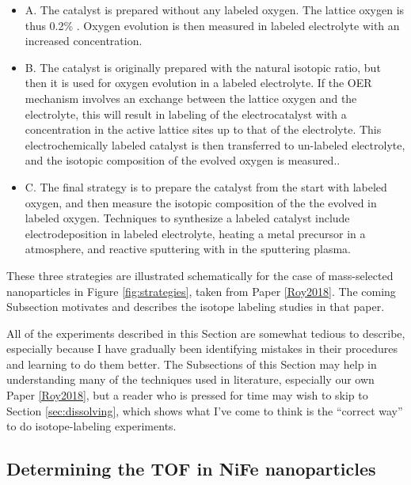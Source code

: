\begin{itemize}
	\item A. The catalyst is prepared without any labeled oxygen. The lattice oxygen is thus 0.2\% . Oxygen evolution is then measured in labeled electrolyte with an increased  concentration\cite{Wohlfahrt-Mehrens1987, Fierro2007, Macounova2009, Amin2017, Roy2018a}.
	
	\item B. The catalyst is originally prepared with the natural isotopic ratio, but then it is used for oxygen evolution in a labeled electrolyte. If the OER mechanism involves an exchange between the lattice oxygen and the electrolyte, this will result in labeling of the electrocatalyst with a  concentration in the active lattice sites up to that of the electrolyte. This electrochemically labeled catalyst is then transferred to un-labeled electrolyte, and the isotopic composition of the evolved oxygen is measured.\cite{Willsau1985, Diaz-Morales2013, Stoerzinger2017a, Amin2017, Grimaud2017, Roy2018a}.
	
	\item C. The final strategy is to prepare the catalyst from the start with labeled oxygen, and then measure the isotopic composition of the the  evolved in labeled oxygen. Techniques to synthesize a labeled catalyst include electrodeposition in labeled electrolyte\cite{Surendranath2010}, heating a metal precursor in a  atmosphere\cite{Roy2018a}, and reactive sputtering with  in the sputtering plasma\cite{Geiger2018}.
\end{itemize}

These three strategies are illustrated schematically for the case of mass-selected nanoparticles in Figure \ref{fig:strategies}, taken from Paper \ref{Roy2018}. The coming Subsection motivates and describes the isotope labeling studies in that paper.

All of the experiments described in this Section are somewhat tedious to describe, especially because I have gradually been identifying mistakes in their procedures and learning to do them better. The Subsections of this Section may help in understanding many of the techniques used in literature, especially our own Paper \ref{Roy2018}, but a reader who is pressed for time may wish to skip to Section \ref{sec:dissolving}, which shows what I've come to think is the ``correct way'' to do isotope-labeling experiments. 

\subsection{Determining the TOF in NiFe nanoparticles}

